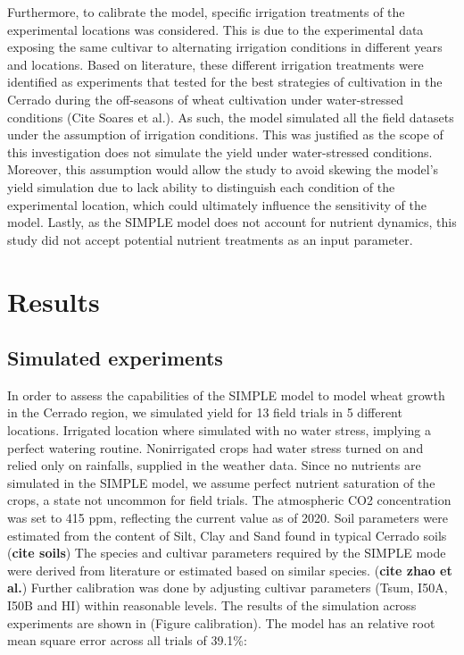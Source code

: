 \documentclass[11pt]{article}
\begin{document}
Furthermore, to calibrate the model, specific irrigation treatments of the experimental locations was considered. This is due to the experimental data exposing the same cultivar to alternating irrigation conditions in different years and locations. Based on literature, these different irrigation treatments were identified as experiments that tested for the best strategies of cultivation in the Cerrado during the off-seasons of wheat cultivation under water-stressed conditions (Cite Soares et al.). As such, the model simulated all the field datasets under the assumption of irrigation conditions. This was justified as the scope of this investigation does not simulate the yield under water-stressed conditions. Moreover, this assumption would allow the study to avoid skewing the model’s yield simulation due to lack ability to distinguish each condition of the experimental location, which could ultimately influence the sensitivity of the model. Lastly, as the SIMPLE model does not account for nutrient dynamics, this study did not accept potential nutrient treatments as an input parameter.


\section{Results}
\label{sec:org2a3a4f3}
\subsection{Simulated experiments}
\label{sec:org28d681f}
In order to assess the capabilities of the SIMPLE model to model wheat growth in the Cerrado region, we simulated yield for 13 field trials in 5 different locations. Irrigated location where simulated with no water stress, implying a perfect watering routine. Nonirrigated crops had water stress turned on and relied only on rainfalls, supplied in the weather data. Since no nutrients are simulated in the SIMPLE model, we assume perfect nutrient saturation of the crops, a state not uncommon for field trials. The atmospheric CO2 concentration was set to 415 ppm, reflecting the current value as of 2020. Soil parameters were estimated from the content of Silt, Clay and Sand found in typical Cerrado soils (\textbf{cite soils})
The species and cultivar parameters required by the SIMPLE mode were derived from literature or estimated based on similar species. (\textbf{cite zhao et al.}) Further calibration was done by adjusting cultivar parameters (Tsum, I50A, I50B and HI) within reasonable levels.
The results of the simulation across experiments are shown in (Figure calibration). The model has an relative root mean square error across all trials of 39.1\%:
\end{document}
